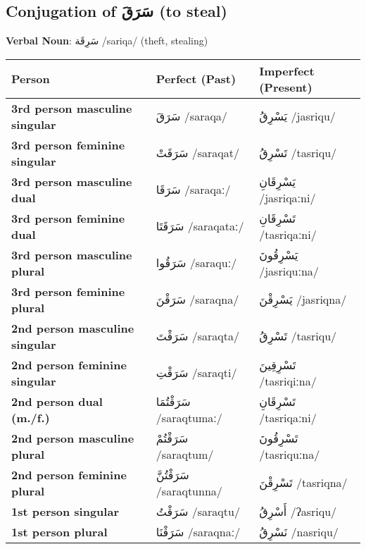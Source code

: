 \documentclass[letterpaper,12pt]{article}
\begin{document}
\subsection{Conjugation of \textarabic{سَرَقَ} (to steal)}
\par{ \large \textbf{Verbal Noun}: \textarabic{سَرِقَة} /sariqa/ (theft, stealing)}

\begin{longtable}{|>{\raggedright}p{3.5cm}|p{5cm}|p{5cm}|}
\hline
\textbf{Person} & \textbf{Perfect (Past)} & \textbf{Imperfect (Present)} \\
\hline
\textbf{3rd person masculine singular} & \textarabic{سَرَقَ} /saraqa/ & \textarabic{يَسْرِقُ} /jasriqu/ \\
\hline
\textbf{3rd person feminine singular} & \textarabic{سَرَقَتْ} /saraqat/ & \textarabic{تَسْرِقُ} /tasriqu/ \\
\hline
\textbf{3rd person masculine dual} & \textarabic{سَرَقَا} /saraqaː/ & \textarabic{يَسْرِقَانِ} /jasriqaːni/ \\
\hline
\textbf{3rd person feminine dual} & \textarabic{سَرَقَتَا} /saraqataː/ & \textarabic{تَسْرِقَانِ} /tasriqaːni/ \\
\hline
\textbf{3rd person masculine plural} & \textarabic{سَرَقُوا} /saraquː/ & \textarabic{يَسْرِقُونَ} /jasriquːna/ \\
\hline
\textbf{3rd person feminine plural} & \textarabic{سَرَقْنَ} /saraqna/ & \textarabic{يَسْرِقْنَ} /jasriqna/ \\
\hline
\textbf{2nd person masculine singular} & \textarabic{سَرَقْتَ} /saraqta/ & \textarabic{تَسْرِقُ} /tasriqu/ \\
\hline
\textbf{2nd person feminine singular} & \textarabic{سَرَقْتِ} /saraqti/ & \textarabic{تَسْرِقِينَ} /tasriqiːna/ \\
\hline
\textbf{2nd person dual (m./f.)} & \textarabic{سَرَقْتُمَا} /saraqtumaː/ & \textarabic{تَسْرِقَانِ} /tasriqaːni/ \\
\hline
\textbf{2nd person masculine plural} & \textarabic{سَرَقْتُمْ} /saraqtum/ & \textarabic{تَسْرِقُونَ} /tasriquːna/ \\
\hline
\textbf{2nd person feminine plural} & \textarabic{سَرَقْتُنَّ} /saraqtunna/ & \textarabic{تَسْرِقْنَ} /tasriqna/ \\
\hline
\textbf{1st person singular} & \textarabic{سَرَقْتُ} /saraqtu/ & \textarabic{أَسْرِقُ} /ʔasriqu/ \\
\hline
\textbf{1st person plural} & \textarabic{سَرَقْنَا} /saraqnaː/ & \textarabic{نَسْرِقُ} /nasriqu/ \\
\hline
\end{longtable}
\end{document}
